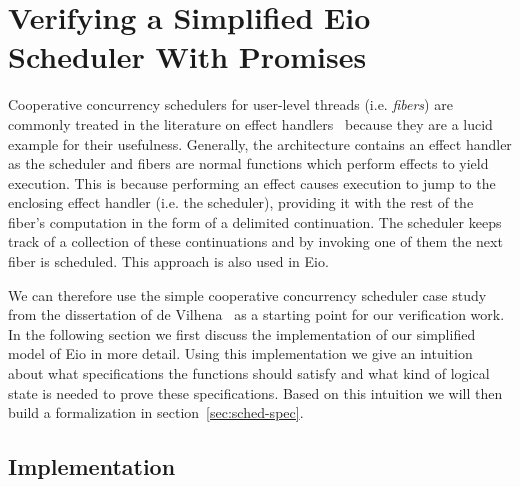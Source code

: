 \section{Verifying a Simplified Eio Scheduler With Promises}
\label{sec:scheduler}


Cooperative concurrency schedulers for user-level threads (i.e. \emph{fibers}) are commonly treated in the literature on effect handlers~\cite{dolan2018concurrent,leijen2017structured,de2021separation} because they are a lucid example for their usefulness.
Generally, the architecture contains an effect handler as the scheduler and fibers are normal functions which perform effects to yield execution.
This is because performing an effect causes execution to jump to the enclosing effect handler (i.e. the scheduler), providing it with the rest of the fiber's computation in the form of a delimited continuation.
The scheduler keeps track of a collection of these continuations and by invoking one of them the next fiber is scheduled.
This approach is also used in Eio.

We can therefore use the simple cooperative concurrency scheduler case study from the dissertation of de Vilhena~\cite{de2022proof} as a starting point for our verification work.
In the following section we first discuss the implementation of our simplified model of Eio in more detail.
Using this implementation we give an intuition about what specifications the functions should satisfy and what kind of logical state is needed to prove these specifications.
Based on this intuition we will then build a formalization in section~\ref{sec:sched-spec}.

\subsection{Implementation}
\label{sec:sched-impl}

